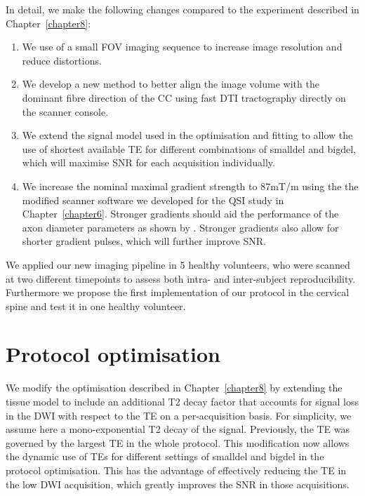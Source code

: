In detail, we make the following changes compared to the \SFasym{} experiment described in Chapter~\ref{chapter8}:
\begin{enumerate}
\item We use of a small \gls{FOV} imaging sequence to increase image resolution and reduce distortions.
\item We develop a new method to better align the image volume with the dominant fibre direction of the \gls{CC} using fast DTI tractography directly on the scanner console.
\item We extend the signal model used in the optimisation and fitting to allow the use of shortest available \gls{TE} for different combinations of \gls{smalldel} and \gls{bigdel}, which will maximise \gls{SNR} for each acquisition individually.
\item We increase the nominal maximal gradient strength to 87mT/m using the the modified scanner software we developed for the QSI study in Chapter~\ref{chapter6}. Stronger gradients should aid the performance of the axon diameter parameters as shown by \citet{Dyrby:2010}. Stronger gradients also allow for shorter gradient pulses, which will further improve \gls{SNR}.
\end{enumerate}
We applied our new imaging pipeline in 5 healthy volunteers, who were scanned at two different timepoints to assess both intra- and inter-subject reproducibility. Furthermore we propose the first implementation of our \SFasym{} protocol in the cervical spine and test it in one healthy volunteer. 


\section{Protocol optimisation}
We modify the \SFasym{} optimisation described in Chapter~\ref{chapter8} by extending the tissue model to include an additional T2 decay factor that accounts for signal loss in the DWI with respect to the \gls{TE} on a per-acquisition basis. For simplicity, we assume here a mono-exponential T2 decay of the signal. Previously, the \gls{TE} was governed by the largest TE in the whole protocol. This modification now allows the dynamic use of \glspl{TE} for different settings of \gls{smalldel} and \gls{bigdel} in the protocol optimisation. This has the advantage of effectively reducing the \gls{TE} in the low DWI acquisition, which greatly improves the \gls{SNR} in those acquisitions.

